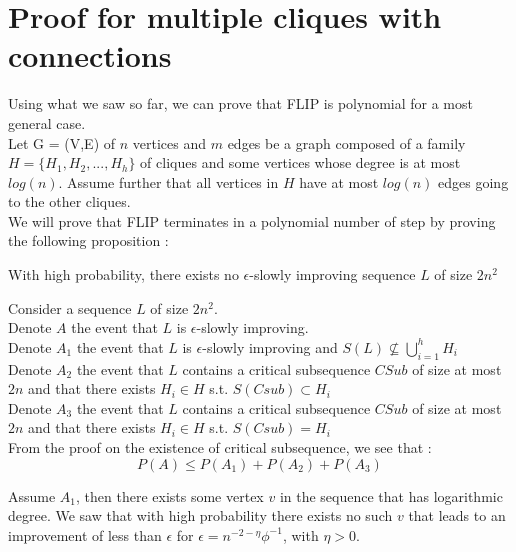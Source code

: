 \section{Proof for multiple cliques with connections}
\label{strongResult}
Using what we saw so far, we can prove that FLIP is polynomial for a most general case. \\
Let G = (V,E) of $n$ vertices and $m$ edges be a graph composed of a family $H = \{H_1, H_2,..., H_h\}$ of cliques and some vertices whose degree is at most $log(n)$. Assume further that all vertices in $H$ have at most $log(n)$ edges going to the other cliques.\\
We will prove that FLIP terminates in a polynomial number of step by proving the following proposition :
\begin{proposition}
With high probability, there exists no $\epsilon$-slowly improving sequence $L$ of size $2n^2$
\end{proposition}

Consider a sequence $L$ of size $2n^2$.\\
Denote $A$ the event that $L$ is $\epsilon$-slowly improving.\\
Denote $A_1$ the event that $L$ is $\epsilon$-slowly improving and $S(L) \not\subseteq \bigcup_{i = 1}^{h}H_i$\\
Denote $A_2$ the event that $L$ contains a critical subsequence $CSub$ of size at most $2n$ and that there exists $H_i \in H$ s.t. $ S(Csub) \subset H_i$ \\
Denote $A_3$ the event that $L$ contains a critical subsequence $CSub$ of size at most $2n$ and that there exists $H_i \in H$ s.t. $ S(Csub) = H_i$\\

From the proof on the existence of critical subsequence, we see that :
\begin{equation*}
P(A) \leq P(A_1) + P(A_2) + P(A_3)
\end{equation*}
 
Assume $A_1$, then there exists some vertex $v$ in the sequence that has logarithmic degree. We saw that with high probability there exists no such $v$ that leads to an improvement of less than $\epsilon$ for $\epsilon = n^{-2-\eta}\phi^{-1}$, with $\eta > 0$.\\

